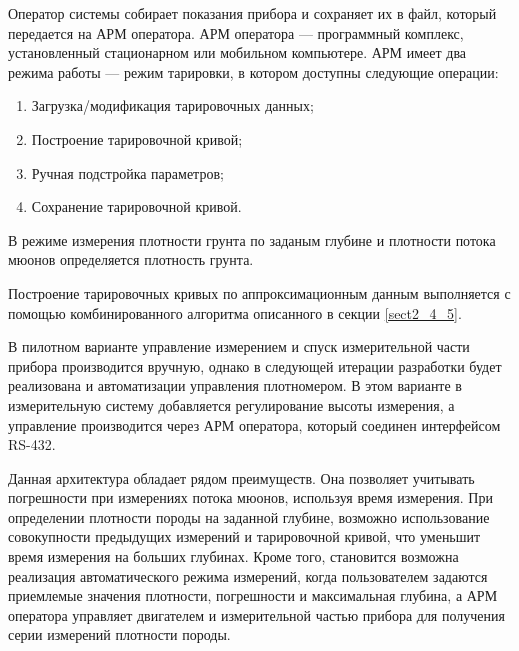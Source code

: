 Оператор системы собирает показания прибора и сохраняет их в файл, который передается на АРМ оператора. АРМ оператора --- программный комплекс, установленный стационарном или мобильном компьютере. АРМ имеет два режима работы --- режим тарировки, в котором доступны следующие операции:

\begin{enumerate}
	\item Загрузка/модификация тарировочных данных;
	\item Построение тарировочной кривой;
	\item Ручная подстройка параметров;
	\item Сохранение тарировочной кривой.
\end{enumerate}

В режиме измерения плотности грунта по заданым глубине и плотности потока мюонов определяется плотность грунта.

Построение тарировочных кривых по аппроксимационным данным выполняется с помощью комбинированного алгоритма описанного в секции \ref{sect2_4_5}.

В пилотном варианте управление измерением и спуск измерительной части прибора производится вручную, однако в следующей итерации разработки будет реализована и автоматизации управления плотномером. В этом варианте в измерительную систему добавляется регулирование высоты измерения, а управление производится через АРМ оператора, который соединен интерфейсом RS-432.

Данная архитектура обладает рядом преимуществ. Она позволяет учитывать погрешности при измерениях потока мюонов, используя время измерения. 
При определении плотности породы на заданной глубине, возможно использование совокупности предыдущих измерений и тарировочной кривой, что уменьшит время измерения на больших глубинах.
Кроме того, становится возможна реализация автоматического режима измерений, когда пользователем задаются приемлемые значения плотности, погрешности и максимальная глубина, а АРМ оператора управляет двигателем и измерительной частью прибора для получения серии измерений плотности породы. 

% 



\clearpage

